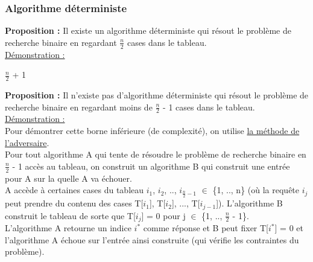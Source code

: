 \documentclass[12pt,a4paper]{article}
\begin{document}
\subsubsection{Algorithme déterministe}
\textbf{Proposition :} Il existe un algorithme déterministe qui résout le problème de recherche binaire en regardant $\frac{n}{2}$ cases dans le tableau.\\
\underline{Démonstration :}\\
\begin{algorithm}[H]
	\Return $\frac{n}{2}$ + 1
\end{algorithm}
\textbf{Proposition :} Il n'existe pas d'algorithme déterministe qui résout le problème de recherche binaire en regardant moins de $\frac{n}{2}$ - 1 cases dans le tableau.\\
\underline{Démonstration :}\\
Pour démontrer cette borne inférieure (de complexité), on utilise \underline{la méthode de l'adversaire}.\\
Pour tout algorithme A qui tente de résoudre le problème de recherche binaire en $\frac{n}{2}$ - 1 accès au tableau, on construit un algorithme B qui construit une entrée pour A sur la quelle A va échouer.\\
A accède à certaines cases du tableau $i_1$, $i_2$, .., $i_{\frac{n}{2}-1}$ $\in$ \{1, .., n\} (où la requête $i_j$ peut prendre du contenu des cases T[$i_1$], T[$i_2$], ..., T[$i_{j-1}$]). L'algorithme B construit le tableau de sorte que T[$i_j$] = 0 pour j $\in$ \{1, .., $\frac{n}{2}$ - 1\}.\\
L'algorithme A retourne un indice $i^*$ comme réponse et B peut fixer T[$i^*$] = 0 et l'algorithme A échoue sur l'entrée ainsi construite (qui vérifie les contraintes du problème).
\end{document}
